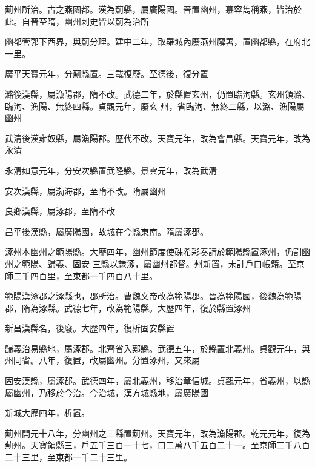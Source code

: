 \begin{pinyinscope}
 薊州所治。古之燕國都。漢為薊縣，屬廣陽國。晉置幽州，慕容雋稱燕，皆治於此。自晉至隋，幽州刺史皆以薊為治所



 幽都管郭下西界，與薊分理。建中二年，取羅城內廢燕州廨署，置幽都縣，在府北一里。



 廣平天寶元年，分薊縣置。三載復廢。至德後，復分置



 潞後漢縣，屬漁陽郡，隋不改。武德二年，於縣置玄州，仍置臨泃縣。玄州領潞、臨泃、漁陽、無終四縣。貞觀元年，廢玄
 州，省臨泃、無終二縣，以潞、漁陽屬幽州



 武清後漢雍奴縣，屬漁陽郡。歷代不改。天寶元年，改為會昌縣。天寶元年，改為永清



 永清如意元年，分安次縣置武隆縣。景雲元年，改為武清



 安次漢縣，屬渤海郡，至隋不改。隋屬幽州



 良鄉漢縣，屬涿郡，至隋不改



 昌平後漢縣，屬廣陽國，故城在今縣東南。隋屬涿郡。



 涿州本幽州之範陽縣。大歷四年，幽州節度使硃希彩奏請於範陽縣置涿州，仍割幽州之範陽、歸義、固安
 三縣以隸涿，屬幽州都督。州新置，未計戶口帳籍。至京師二千四百里，至東都一千四百八十里。



 範陽漢涿郡之涿縣也，郡所治。曹魏文帝改為範陽郡。晉為範陽國，後魏為範陽郡，隋為涿縣。武德七年，改為範陽縣。大歷四年，復於縣置涿州



 新昌漢縣名，後廢。大歷四年，復析固安縣置



 歸義治易縣地，屬涿郡。北齊省入鄚縣。武德五年，於縣置北義州。貞觀元年，與州同省。八年，復置，改屬幽州。分置涿州，又來屬



 固安漢縣，屬涿郡。武德四年，屬北義州，移治章信城。貞觀元年，省義州，以縣屬幽州，乃移於今治。今治城，漢方城縣地，屬廣陽國



 新城大歷四年，析置。



 薊州開元十八年，分幽州之三縣置薊州。天寶元年，改為漁陽郡。乾元元年，復為薊州。天寶領縣三，戶五千三百一十七，口二萬八千五百二十一。至京師二千八百二十三里，至東都一千二十三里。




\end{pinyinscope}
